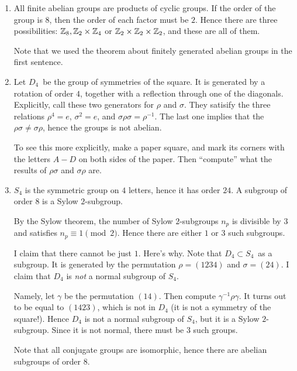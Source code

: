 \documentclass[11pt, english]{article}
\begin{document}
\begin{sol}
\begin{enumerate}
	\item All finite abelian groups are products of cyclic groups. If the order of the group is $8$, then the order of each factor must be $2$. Hence there are three possibilities: $\mathbb{Z}_8, \mathbb{Z}_2 \times \mathbb{Z}_4$ or $\mathbb{Z}_2 \times \mathbb{Z}_2 \times \mathbb{Z}_2$, and these are all of them.

	Note that we used the theorem about finitely generated abelian groups in the first sentence.
	\item Let $D_4$ be the group of symmetries of the square. It is generated by a rotation of order $4$, together with a reflection through one of the diagonals. Explicitly, call these two generators for $\rho$ and $\sigma$. They satisify the three relations $\rho^4=e$, $\sigma^2=e$, and $\sigma \rho \sigma = \rho^{-1}$. The last one implies that the $\rho \sigma \neq \sigma \rho$, hence the groups is not abelian.

	To see this more explicitly, make a paper square, and mark its corners with the letters $A-D$ on both sides of the paper. Then ``compute'' what the results of $\rho \sigma$ and $\sigma \rho$ are.
	\item $S_4$ is the symmetric group on $4$ letters, hence it has order $24$. A subgroup of order $8$ is a Sylow $2$-subgroup. 

	By the Sylow theorem, the number of Sylow $2$-subgroups $n_p$ is divisible by $3$ and satisfies $n_p \equiv 1 \pmod 2$. Hence there are either $1$ or $3$ such subgroups.

	I claim that there cannot be just $1$. Here's why. Note that $D_4 \subset S_4$ as a subgroup. It is generated by the permutation $\rho=(1234)$ and $\sigma=(24)$. I claim that $D_4$ is \emph{not} a normal subgroup of $S_4$.

	Namely, let $\gamma$ be the permutation $(14)$. Then compute $\gamma^{-1}\rho \gamma$. It turns out to be equal to $(1423)$, which is not in $D_4$ (it is not a symmetry of the square!). Hence $D_4$ is not a normal subgroup of $S_4$, but it is a Sylow $2$-subgroup. Since it is not normal, there must be $3$ such groups.

	Note that all conjugate groups are isomorphic, hence there are abelian subgroups of order $8$.
\end{enumerate}
\end{sol}
\end{document}
